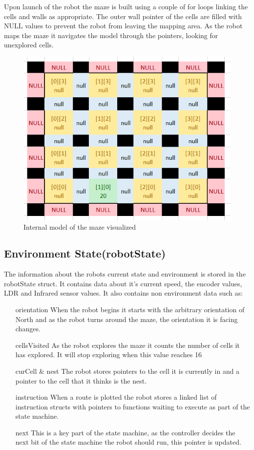 \documentclass[11pt,a4paper,titlepage]{article}
\begin{document}
            Upon launch of the robot the maze is built using a couple of for loops linking the cells and walls as appropriate. 
            The outer wall pointer of the cells are filled with NULL values to prevent the robot from leaving the mapping area.
            As the robot maps the maze it navigates the model through the pointers, looking for unexplored cells.
            \begin{figure}[H]
                \caption{Internal model of the maze visualized}
                \includegraphics[width=17cm,keepaspectratio]{mazeModel}
            \end{figure}
        \subsection{Environment State(robotState)}
            The information about the robots current state and environment is stored in the robotState struct.
            It contains data about it's current speed, the encoder values, LDR and Infrared sensor values.
            It also contains non environment data such as:
            \begin{itemize}
                \item[orientation] When the robot begins it starts with the arbitrary orientation of North and as the robot turns around the maze, the orientation it is facing changes.
                \item[cellsVisited] As the robot explores the maze it counts the number of cells it has explored. It will stop exploring when this value reaches 16
                \item[curCell \& nest] The robot stores pointers to the cell it is currently in and a pointer to the cell that it thinks is the nest.
                \item[instruction] When a route is plotted the robot stores a linked list of instruction structs with pointers to functions waiting to execute as part of the state machine.
                \item[next] This is a key part of the state machine, as the controller decides the next bit of the state machine the robot should run, this pointer is updated.
            \end{itemize}
\end{document}
